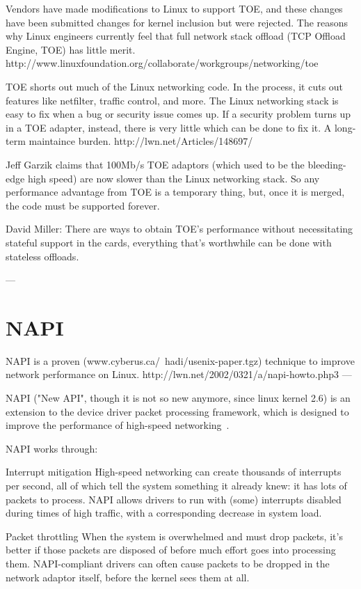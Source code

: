 Vendors have made modifications to Linux to support TOE, and these changes have been submitted changes for kernel inclusion but were rejected.
The reasons why Linux engineers currently feel that full network stack offload (TCP Offload Engine, TOE) has little merit.
http://www.linuxfoundation.org/collaborate/workgroups/networking/toe

TOE shorts out much of the Linux networking code.
In the process, it cuts out features like netfilter, traffic control, and more.
The Linux networking stack is easy to fix when a bug or security issue comes up. If a security problem turns up in a TOE adapter, instead, there is very little which can be done to fix it.
A long-term maintaince burden. http://lwn.net/Articles/148697/

Jeff Garzik claims that 100Mb/s TOE adaptors
(which used to be the bleeding-edge high speed)
are now slower than the Linux networking stack.
So any performance advantage from TOE is a temporary thing, but, once it is merged, the code must be supported forever.

David Miller: There are ways to obtain TOE's performance without
necessitating stateful support in the cards, everything that's
worthwhile can be done with stateless offloads.

---


\section{NAPI}

NAPI is a proven (www.cyberus.ca/~hadi/usenix-paper.tgz) technique
to improve network performance on Linux.
http://lwn.net/2002/0321/a/napi-howto.php3
---

NAPI ("New API", though it is not so new anymore, since linux kernel 2.6) is an extension to the device driver packet processing framework, which is designed to improve the performance of high-speed networking~\cite{linux-foundation-napi}.

NAPI works through:

Interrupt mitigation 
    High-speed networking can create thousands of interrupts per second, all of which tell the system something it already knew: it has lots of packets to process. NAPI allows drivers to run with (some) interrupts disabled during times of high traffic, with a corresponding decrease in system load.

Packet throttling 
    When the system is overwhelmed and must drop packets, it's better if those packets are disposed of before much effort goes into processing them. NAPI-compliant drivers can often cause packets to be dropped in the network adaptor itself, before the kernel sees them at all.


